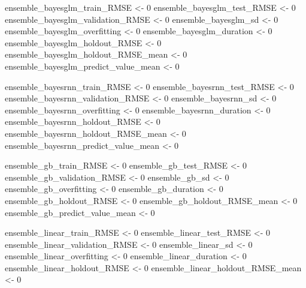 \documentclass[
]{book}
\newenvironment{Shaded}{\begin{snugshade}}{\end{snugshade}}
\newcommand{\DecValTok}[1]{\textcolor[rgb]{0.00,0.00,0.81}{#1}}
\newcommand{\NormalTok}[1]{#1}
\newcommand{\OtherTok}[1]{\textcolor[rgb]{0.56,0.35,0.01}{#1}}
\begin{document}
\begin{Shaded}
\begin{Highlighting}[]
\NormalTok{ensemble\_bayesglm\_train\_RMSE }\OtherTok{\textless{}{-}} \DecValTok{0}
\NormalTok{ensemble\_bayesglm\_test\_RMSE }\OtherTok{\textless{}{-}} \DecValTok{0}
\NormalTok{ensemble\_bayesglm\_validation\_RMSE }\OtherTok{\textless{}{-}} \DecValTok{0}
\NormalTok{ensemble\_bayesglm\_sd }\OtherTok{\textless{}{-}} \DecValTok{0}
\NormalTok{ensemble\_bayesglm\_overfitting }\OtherTok{\textless{}{-}} \DecValTok{0}
\NormalTok{ensemble\_bayesglm\_duration }\OtherTok{\textless{}{-}} \DecValTok{0}
\NormalTok{ensemble\_bayesglm\_holdout\_RMSE }\OtherTok{\textless{}{-}} \DecValTok{0}
\NormalTok{ensemble\_bayesglm\_holdout\_RMSE\_mean }\OtherTok{\textless{}{-}} \DecValTok{0}
\NormalTok{ensemble\_bayesglm\_predict\_value\_mean }\OtherTok{\textless{}{-}} \DecValTok{0}

\NormalTok{ensemble\_bayesrnn\_train\_RMSE }\OtherTok{\textless{}{-}} \DecValTok{0}
\NormalTok{ensemble\_bayesrnn\_test\_RMSE }\OtherTok{\textless{}{-}} \DecValTok{0}
\NormalTok{ensemble\_bayesrnn\_validation\_RMSE }\OtherTok{\textless{}{-}} \DecValTok{0}
\NormalTok{ensemble\_bayesrnn\_sd }\OtherTok{\textless{}{-}} \DecValTok{0}
\NormalTok{ensemble\_bayesrnn\_overfitting }\OtherTok{\textless{}{-}} \DecValTok{0}
\NormalTok{ensemble\_bayesrnn\_duration }\OtherTok{\textless{}{-}} \DecValTok{0}
\NormalTok{ensemble\_bayesrnn\_holdout\_RMSE }\OtherTok{\textless{}{-}} \DecValTok{0}
\NormalTok{ensemble\_bayesrnn\_holdout\_RMSE\_mean }\OtherTok{\textless{}{-}} \DecValTok{0}
\NormalTok{ensemble\_bayesrnn\_predict\_value\_mean }\OtherTok{\textless{}{-}} \DecValTok{0}

\NormalTok{ensemble\_gb\_train\_RMSE }\OtherTok{\textless{}{-}} \DecValTok{0}
\NormalTok{ensemble\_gb\_test\_RMSE }\OtherTok{\textless{}{-}} \DecValTok{0}
\NormalTok{ensemble\_gb\_validation\_RMSE }\OtherTok{\textless{}{-}} \DecValTok{0}
\NormalTok{ensemble\_gb\_sd }\OtherTok{\textless{}{-}} \DecValTok{0}
\NormalTok{ensemble\_gb\_overfitting }\OtherTok{\textless{}{-}} \DecValTok{0}
\NormalTok{ensemble\_gb\_duration }\OtherTok{\textless{}{-}} \DecValTok{0}
\NormalTok{ensemble\_gb\_holdout\_RMSE }\OtherTok{\textless{}{-}} \DecValTok{0}
\NormalTok{ensemble\_gb\_holdout\_RMSE\_mean }\OtherTok{\textless{}{-}} \DecValTok{0}
\NormalTok{ensemble\_gb\_predict\_value\_mean }\OtherTok{\textless{}{-}} \DecValTok{0}

\NormalTok{ensemble\_linear\_train\_RMSE }\OtherTok{\textless{}{-}} \DecValTok{0}
\NormalTok{ensemble\_linear\_test\_RMSE }\OtherTok{\textless{}{-}} \DecValTok{0}
\NormalTok{ensemble\_linear\_validation\_RMSE }\OtherTok{\textless{}{-}} \DecValTok{0}
\NormalTok{ensemble\_linear\_sd }\OtherTok{\textless{}{-}} \DecValTok{0}
\NormalTok{ensemble\_linear\_overfitting }\OtherTok{\textless{}{-}} \DecValTok{0}
\NormalTok{ensemble\_linear\_duration }\OtherTok{\textless{}{-}} \DecValTok{0}
\NormalTok{ensemble\_linear\_holdout\_RMSE }\OtherTok{\textless{}{-}} \DecValTok{0}
\NormalTok{ensemble\_linear\_holdout\_RMSE\_mean }\OtherTok{\textless{}{-}} \DecValTok{0}


\end{Highlighting}
\end{Shaded}
\end{document}
